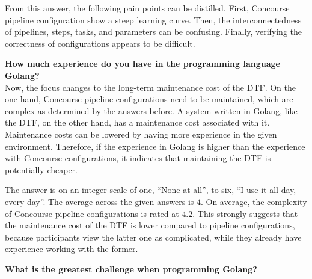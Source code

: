 From this answer, the following pain points can be distilled.
First, Concourse pipeline configuration show a steep learning curve.
Then, the interconnectedness of pipelines, steps, tasks, and parameters can be confusing.
Finally, verifying the correctness of configurations appears to be difficult.

\textbf{How much experience do you have in the programming language Golang?}\\
Now, the focus changes to the long-term maintenance cost of the DTF.
On the one hand, Concourse pipeline configurations need to be maintained, which are complex as determined by the answers before.
A system written in Golang, like the DTF, on the other hand, has a maintenance cost associated with it.
Maintenance costs can be lowered by having more experience in the given environment.
Therefore, if the experience in Golang is higher than the experience with Concourse configurations, it indicates that maintaining the DTF is potentially cheaper.

The answer is on an integer scale of one, ``None at all'', to six, ``I use it all day, every day''.
The average across the given answers is $4$.
On average, the complexity of Concourse pipeline configurations is rated at $4.2$.
This strongly suggests that the maintenance cost of the DTF is lower compared to pipeline configurations, because participants view the latter one as complicated, while they already have experience working with the former.

\textbf{What is the greatest challenge when programming Golang?}\\
